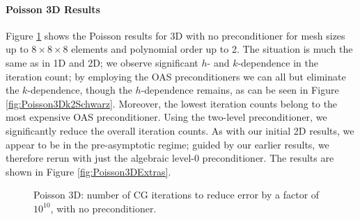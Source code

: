 
\paragraph{Poisson 3D Results}
Figure \ref{fig:Poisson3DNoPreconditioner} shows the Poisson results for 3D with no preconditioner for mesh sizes up to $8 \times 8 \times 8$ elements and polynomial order up to 2.  The situation is much the same as in 1D and 2D; we observe significant $h$- and $k$-dependence in the iteration count; by employing the OAS preconditioners we can all but eliminate the $k$-dependence, though the $h$-dependence remains, as can be seen in Figure \ref{fig:Poisson3Dk2Schwarz}.  Moreover, the lowest iteration counts belong to the most expensive OAS preconditioner.  Using the two-level preconditioner, we significantly reduce the overall iteration counts.  As with our initial 2D results, we appear to be in the pre-asymptotic regime; guided by our earlier results, we therefore rerun with just the algebraic level-0 preconditioner.  The results are shown in Figure \ref{fig:Poisson3DExtras}.

\begin{figure}[ht]
	\centering
		    \scalebox{\plotscaling}{
			\begin{tikzpicture}
			\begin{axis}[
			    scaled ticks=false,
			    tick label style={/pgf/number format/fixed},
			    title={Poisson 3D, No Preconditioner}, 
			    xlabel={Mesh Width (\# Elements)}, 
			    ylabel={Iteration Count}, 
			    grid=major,
			    legend entries={$k=1$,$k=2$},
			    legend pos=outer north east,
			    xtick=data,
			    xticklabels={2,4,8}
			  ]
			  \addplot table [header=false, x index=\meshwidthindex, y index=\iterationcountindex, each nth point=\PoissonThreeDNthPoint, skip first n=1, filter discard warning=false, unbounded coords=discard, skip coords between index={\PoissonThreeDStride}{\maxmyrows}]{data/PoissonDriver3D_results_512_ranks_nonconforming.dat};
			  \addplot table [header=false, x index=\meshwidthindex, y index=\iterationcountindex, each nth point=\PoissonThreeDNthPoint, skip first n=2, filter discard warning=false, unbounded coords=discard, skip coords between index={\PoissonThreeDStride}{\maxmyrows}]{data/PoissonDriver3D_results_512_ranks_nonconforming.dat};
			\end{axis}
			\end{tikzpicture}
		    }
	\caption{Poisson 3D: number of CG iterations to reduce error by a factor of $10^{10}$, with no preconditioner.}
	\label{fig:Poisson3DNoPreconditioner}
\end{figure}

